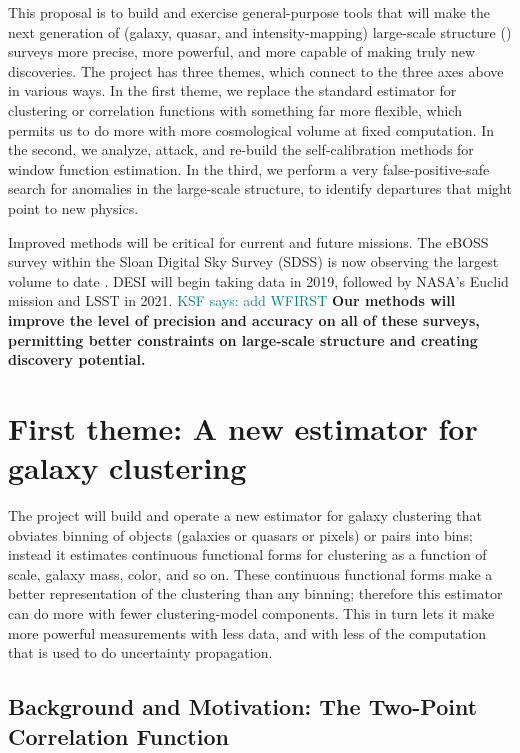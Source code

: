 \documentclass[12pt, fullpage, letterpaper]{article}
\newcommand{\KSF}[1]{\textcolor{teal}{KSF says: #1}}
\begin{document}
This proposal is to build and exercise general-purpose tools that will
make the next generation of (galaxy, quasar, and intensity-mapping)
large-scale structure (\LSS) surveys more precise, more powerful, and
more capable of making truly new discoveries.
The project has three themes, which connect to the three axes above in
various ways.
In the first theme, we replace the standard estimator for clustering or
correlation functions with something far more flexible, which permits us
to do more with more cosmological volume at fixed computation.
In the second, we analyze, attack, and re-build the self-calibration 
methods for window function estimation.
In the third, we perform a very false-positive-safe search for anomalies
in the large-scale structure, to identify departures that might point to
new physics.

Improved methods will be critical for current and future missions.
The eBOSS survey within the Sloan Digital Sky Survey (SDSS) is now observing the largest volume to date \citep{Dawson2015}. 
DESI \citep{Aghamousa2016} will begin taking data in 2019, followed by NASA's Euclid mission \citep{Amiaux2012} and LSST \citep{Ivezic2018} in 2021. \KSF{add WFIRST}
\textbf{Our methods will improve the level of precision and accuracy on all of these surveys, permitting better constraints on large-scale structure and creating discovery potential.}

\section{First theme: A new estimator for galaxy clustering}

The project will build and operate a new estimator for
galaxy clustering that obviates binning of objects (galaxies or
quasars or pixels) or pairs into bins; instead it estimates continuous
functional forms for clustering as a function of scale, galaxy mass,
color, and so on.
These continuous functional forms make a better representation of the
clustering than any binning; therefore this estimator can do more with
fewer clustering-model components.
This in turn lets it make more powerful measurements with less data,
and with less of the computation that is used to do uncertainty
propagation.

\subsection{Background and Motivation: The Two-Point Correlation Function}
\end{document}
